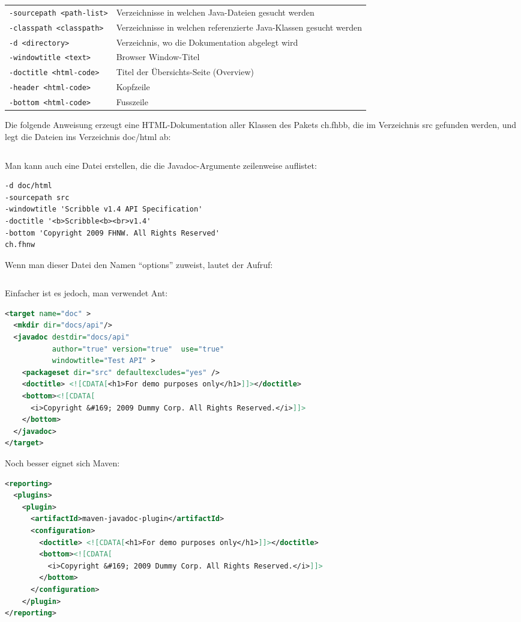 \begin{tabularx}{\linewidth}{lX}
\verb+-sourcepath <path-list>+ & Verzeichnisse in welchen Java-Dateien gesucht
                        werden\\
\verb+-classpath <classpath>+ & Verzeichnisse in welchen referenzierte Java-Klassen gesucht werden\\
\verb+-d <directory>+ & Verzeichnis, wo die Dokumentation abgelegt wird\\
\verb+-windowtitle <text>+   & Browser Window-Titel\\
\verb+-doctitle <html-code>+ & Titel der Übersichts-Seite (Overview)\\
\verb+-header <html-code>+   & Kopfzeile\\
\verb+-bottom <html-code>+   & Fusszeile\\
\end{tabularx}
\newslide
Die folgende Anweisung erzeugt eine HTML-Dokumentation aller Klassen des Pakets
ch.fhbb, die im Verzeichnis src gefunden werden, und legt die Dateien ins
Verzeichnis doc/html ab:
\begin{lstlisting}[language=csh]
% javadoc -d doc/html -sourcepath src ch.fhbb
\end{lstlisting}
\newslide
Man kann auch eine Datei erstellen, die die Javadoc-Argumente zeilenweise
auflistet:
\begin{verbatim}
-d doc/html
-sourcepath src
-windowtitle 'Scribble v1.4 API Specification'
-doctitle '<b>Scribble<b><br>v1.4'
-bottom 'Copyright 2009 FHNW. All Rights Reserved'
ch.fhnw
\end{verbatim}
Wenn man dieser Datei den Namen ``options'' zuweist, lautet der Aufruf:
\begin{lstlisting}[language=csh]
% javadoc @options
\end{lstlisting}
\newslide
Einfacher ist es jedoch, man verwendet Ant:
\begin{lstlisting}[language=xml
  ,morekeywords={target,mkdir,javadoc,packageset,doctitle,bottom}]
<target name="doc" >
  <mkdir dir="docs/api"/>
  <javadoc destdir="docs/api"
           author="true" version="true"  use="true"
           windowtitle="Test API" >
    <packageset dir="src" defaultexcludes="yes" />
    <doctitle> <![CDATA[<h1>For demo purposes only</h1>]]></doctitle>
    <bottom><![CDATA[
      <i>Copyright &#169; 2009 Dummy Corp. All Rights Reserved.</i>]]>
    </bottom>
  </javadoc>
</target>
\end{lstlisting}
\newslide
Noch besser eignet sich Maven:
\begin{lstlisting}[language=xml,
  morekeywords={reporting,plugins,plugin,artifactId,configuration,doctitle,bottom}]
<reporting>
  <plugins>
    <plugin>
      <artifactId>maven-javadoc-plugin</artifactId>
      <configuration>
        <doctitle> <![CDATA[<h1>For demo purposes only</h1>]]></doctitle>
        <bottom><![CDATA[
          <i>Copyright &#169; 2009 Dummy Corp. All Rights Reserved.</i>]]>
        </bottom>
      </configuration>
    </plugin>
</reporting>
\end{lstlisting}
